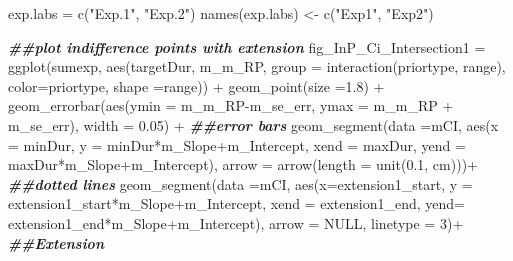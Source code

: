 \documentclass[
]{article}
\newenvironment{Shaded}{\begin{snugshade}}{\end{snugshade}}
\newcommand{\AttributeTok}[1]{\textcolor[rgb]{0.77,0.63,0.00}{#1}}
\newcommand{\ConstantTok}[1]{\textcolor[rgb]{0.00,0.00,0.00}{#1}}
\newcommand{\DecValTok}[1]{\textcolor[rgb]{0.00,0.00,0.81}{#1}}
\newcommand{\DocumentationTok}[1]{\textcolor[rgb]{0.56,0.35,0.01}{\textbf{\textit{#1}}}}
\newcommand{\FloatTok}[1]{\textcolor[rgb]{0.00,0.00,0.81}{#1}}
\newcommand{\FunctionTok}[1]{\textcolor[rgb]{0.00,0.00,0.00}{#1}}
\newcommand{\NormalTok}[1]{#1}
\newcommand{\OtherTok}[1]{\textcolor[rgb]{0.56,0.35,0.01}{#1}}
\newcommand{\SpecialCharTok}[1]{\textcolor[rgb]{0.00,0.00,0.00}{#1}}
\newcommand{\StringTok}[1]{\textcolor[rgb]{0.31,0.60,0.02}{#1}}
\begin{document}
\begin{Shaded}
\begin{Highlighting}[]
\NormalTok{exp.labs }\OtherTok{=} \FunctionTok{c}\NormalTok{(}\StringTok{"Exp.1"}\NormalTok{, }\StringTok{"Exp.2"}\NormalTok{) }
\FunctionTok{names}\NormalTok{(exp.labs) }\OtherTok{\textless{}{-}} \FunctionTok{c}\NormalTok{(}\StringTok{"Exp1"}\NormalTok{, }\StringTok{"Exp2"}\NormalTok{)}

\DocumentationTok{\#\#plot indifference points with extension}
\NormalTok{fig\_InP\_Ci\_Intersection1 }\OtherTok{=} \FunctionTok{ggplot}\NormalTok{(sumexp,}
                                 \FunctionTok{aes}\NormalTok{(targetDur, m\_m\_RP, }\AttributeTok{group =} \FunctionTok{interaction}\NormalTok{(priortype, range), }\AttributeTok{color=}\NormalTok{priortype, }\AttributeTok{shape =}\NormalTok{range))  }\SpecialCharTok{+}
  \FunctionTok{geom\_point}\NormalTok{(}\AttributeTok{size =}\FloatTok{1.8}\NormalTok{) }\SpecialCharTok{+} 
  \FunctionTok{geom\_errorbar}\NormalTok{(}\FunctionTok{aes}\NormalTok{(}\AttributeTok{ymin =}\NormalTok{ m\_m\_RP}\SpecialCharTok{{-}}\NormalTok{m\_se\_err, }\AttributeTok{ymax =}\NormalTok{ m\_m\_RP }\SpecialCharTok{+}\NormalTok{ m\_se\_err), }\AttributeTok{width =} \FloatTok{0.05}\NormalTok{) }\SpecialCharTok{+}  \DocumentationTok{\#\#error bars}
  \FunctionTok{geom\_segment}\NormalTok{(}\AttributeTok{data =}\NormalTok{mCI, }\FunctionTok{aes}\NormalTok{(}\AttributeTok{x =}\NormalTok{ minDur, }\AttributeTok{y =}\NormalTok{ minDur}\SpecialCharTok{*}\NormalTok{m\_Slope}\SpecialCharTok{+}\NormalTok{m\_Intercept, }\AttributeTok{xend =}\NormalTok{ maxDur, }\AttributeTok{yend =}\NormalTok{ maxDur}\SpecialCharTok{*}\NormalTok{m\_Slope}\SpecialCharTok{+}\NormalTok{m\_Intercept), }\AttributeTok{arrow =} \FunctionTok{arrow}\NormalTok{(}\AttributeTok{length =} \FunctionTok{unit}\NormalTok{(}\FloatTok{0.1}\NormalTok{, }\StringTok{\textquotesingle{}cm\textquotesingle{}}\NormalTok{)))}\SpecialCharTok{+}  \DocumentationTok{\#\#dotted lines}
  \FunctionTok{geom\_segment}\NormalTok{(}\AttributeTok{data =}\NormalTok{mCI, }\FunctionTok{aes}\NormalTok{(}\AttributeTok{x=}\NormalTok{extension1\_start, }\AttributeTok{y =}\NormalTok{ extension1\_start}\SpecialCharTok{*}\NormalTok{m\_Slope}\SpecialCharTok{+}\NormalTok{m\_Intercept, }\AttributeTok{xend =}\NormalTok{ extension1\_end, }\AttributeTok{yend=}\NormalTok{ extension1\_end}\SpecialCharTok{*}\NormalTok{m\_Slope}\SpecialCharTok{+}\NormalTok{m\_Intercept), }\AttributeTok{arrow =} \ConstantTok{NULL}\NormalTok{, }\AttributeTok{linetype =} \DecValTok{3}\NormalTok{)}\SpecialCharTok{+}  \DocumentationTok{\#\#Extension}

\end{Highlighting}
\end{Shaded}
\end{document}
